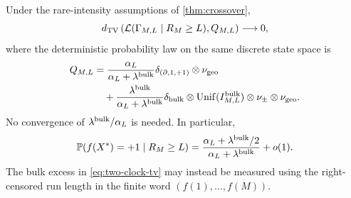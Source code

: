 \begin{theorem}\label{thm:two-clock}
Under the rare-intensity assumptions of \cref{thm:crossover},
\begin{equation}\label{eq:two-clock-tv}
 d_{\mathrm{TV}}\left(\mathcal L(\Gamma_{M,L}\mid R_M\ge L),Q_{M,L}\right)\longrightarrow0,
\end{equation}
where the deterministic probability law on the same discrete state space is
\begin{align}
 Q_{M,L}
 &=\frac{\alpha_L}{\alpha_L+\lambda^{\rm bulk}}
        \delta_{(\partial,1,+1)}\otimes\nu_{\rm geo}
       \notag\\
 &\quad+\frac{\lambda^{\rm bulk}}{\alpha_L+\lambda^{\rm bulk}}
        \delta_{\mathrm{bulk}}\otimes
        \operatorname{Unif}(I^{\rm bulk}_{M,L})\otimes\nu_\pm
                     \otimes\nu_{\rm geo}.
       \label{eq:two-clock-target}
\end{align}
No convergence of $\lambda^{\rm bulk}/\alpha_L$ is needed. In particular,
\begin{equation}\label{eq:crossover-positive-sign}
 \mathbb P(f(X^*)=+1\mid R_M\ge L)
  =\frac{\alpha_L+\lambda^{\rm bulk}/2}
         {\alpha_L+\lambda^{\rm bulk}}+o(1).
\end{equation}
The bulk excess in \eqref{eq:two-clock-tv} may instead be measured using
the right-censored run length in the finite word $(f(1),\ldots,f(M))$.
\end{theorem}
